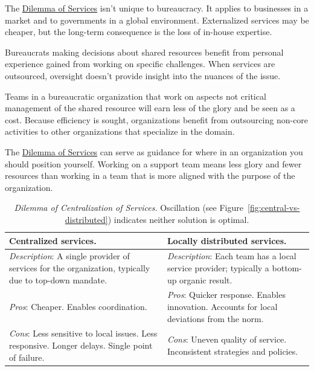 The \hyperref[table:dilemma-org-inhouse-vs-external]{Dilemma of Services} isn't unique to bureaucracy. It applies to businesses in a market and to governments in a global environment. Externalized services may be cheaper, but the long-term consequence is the loss of in-house expertise. 


Bureaucrats making decisions about shared resources benefit from personal experience gained from working on specific challenges. 
When services are outsourced, oversight doesn't provide insight into the nuances of the issue.

Teams in a bureaucratic organization that work on aspects not critical management of the shared resource will earn less of the glory and be seen as a cost. Because efficiency is sought, organizations benefit from outsourcing non-core activities to other organizations that specialize in the domain.

The \hyperref[table:dilemma-org-inhouse-vs-external]{Dilemma of Services} can serve as guidance for where in an organization you should position yourself. Working on a support team means less glory and fewer resources than working in a team that is more aligned with the purpose of the organization.



\begin{center}
\begin{table}[H] %
\begin{tabular}{ | m{\dilemmatablewidth}| m{\dilemmatablewidth} | } 
  \hline
  \textbf{Centralized services.} &
  \textbf{Locally distributed services.} \\
  \hline
  \textit{Description}: A single provider of services for the organization, typically due to top-down mandate. &
  \textit{Description}: Each team has a local service provider; typically a bottom-up organic result. \\  
  \hline
  \textit{Pros}: Cheaper. Enables coordination. &
  \textit{Pros}: Quicker response. 
  Enables innovation. 
  Accounts for local deviations from the norm. \\
  \hline
  \textit{Cons}: Less sensitive to local issues. Less responsive. Longer delays. Single point of failure.  & 
  \textit{Cons}: Uneven quality of service. Inconsistent strategies and policies. \\
  \hline
\end{tabular}
\caption{
\textit{Dilemma of Centralization of Services.}
Oscillation (see Figure~\ref{fig:central-vs-distributed}) indicates neither solution is optimal.
}
\label{table:dilemma-org-central-vs-distributed}
\end{table}
\end{center}

